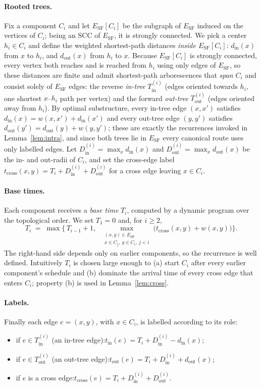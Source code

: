 \documentclass[11pt]{article}
\theoremstyle{definition}
\theoremstyle{remark}
\newcommand{\ESF}{E_{\mathrm{SF}}}
\newcommand{\Tin}{T^{(i)}_{\mathrm{in}}}
\newcommand{\Tout}{T^{(i)}_{\mathrm{out}}}
\newcommand{\din}{d_{\mathrm{in}}}
\newcommand{\dout}{d_{\mathrm{out}}}
\newcommand{\Din}{D^{(i)}_{\mathrm{in}}}
\newcommand{\Dout}{D^{(i)}_{\mathrm{out}}}
\begin{document}
\paragraph{Rooted trees.} Fix a component $C_i$ and let $\ESF[C_i]$ be the subgraph of $\ESF$ induced
on the vertices of $C_i$; being an SCC of $\ESF$, it is strongly connected. We pick a center
$h_i\in C_i$ and define the weighted shortest-path distances \emph{inside $\ESF[C_i]$}: $\din(x)$ from
$x$ to $h_i$, and $\dout(x)$ from $h_i$ to $x$. Because $\ESF[C_i]$ is strongly connected, every
vertex both reaches and is reached from $h_i$ using only edges of $\ESF$, so these distances are
finite and admit shortest-path arborescences that \emph{span} $C_i$ and consist solely of $\ESF$
edges: the reverse \emph{in-tree} $\Tin$ (edges oriented towards $h_i$, one shortest $x$--$h_i$ path
per vertex) and the forward \emph{out-tree} $\Tout$ (edges oriented away from $h_i$). By optimal
substructure, every in-tree edge $(x,x')$ satisfies $\din(x)=w(x,x')+\din(x')$ and every out-tree edge
$(y,y')$ satisfies $\dout(y')=\dout(y)+w(y,y')$; these are exactly the recurrences invoked in
Lemma~\ref{lem:intra}, and since both trees lie in $\ESF$ every canonical route uses only labelled
edges. Let $\Din=\max_x\din(x)$ and $\Dout=\max_x\dout(x)$ be the in- and out-radii of $C_i$, and set
the cross-edge label $t_{\mathrm{cross}}(x,y)=T_i+\Din+\Dout$ for a cross edge leaving $x\in C_i$.

\paragraph{Base times.} Each component receives a \emph{base time} $T_i$, computed by a dynamic
program over the topological order. We set $T_1=0$ and, for $i\ge 2$,
\begin{equation}\label{eq:basetime}
  T_i \;=\; \max\Big\{\,T_{i-1}+1,\;\;
      \max_{\substack{(x,y)\in\ESF\\ x\in C_j,\ y\in C_i,\ j<i}}
      \big(t_{\mathrm{cross}}(x,y)+w(x,y)\big)\Big\}.
\end{equation}
The right-hand side depends only on earlier components, so the recurrence is well defined. Intuitively
$T_i$ is chosen large enough to (a) start $C_i$ after every earlier component's schedule and (b)
dominate the arrival time of every cross edge that enters $C_i$; property (b) is used in
Lemma~\ref{lem:cross}.

\paragraph{Labels.} Finally each edge $e=(x,y)$, with $x\in C_i$, is labelled according to its role:
\begin{itemize}[topsep=2pt,itemsep=3pt]
  \item if $e\in\Tin$ (an in-tree edge):\quad $t_{\mathrm{in}}(e)=T_i+\Din-\din(x)$;
  \item if $e\in\Tout$ (an out-tree edge):\quad $t_{\mathrm{out}}(e)=T_i+\Din+\dout(x)$;
  \item if $e$ is a cross edge:\quad $t_{\mathrm{cross}}(e)=T_i+\Din+\Dout$.
\end{itemize}
\end{document}
